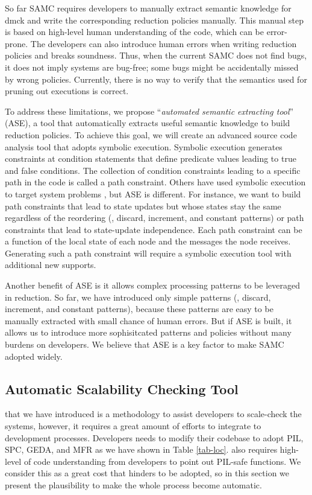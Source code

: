 So far SAMC requires developers to manually extract semantic knowledge for dmck
and write the corresponding reduction policies manually. This manual step is
based on high-level human understanding of the code, which can be error-prone.
The developers can also introduce human errors when writing reduction policies
and breaks soundness. Thus, when the current SAMC does not find bugs, it does
not imply systems are bug-free; some bugs might be accidentally missed by wrong
policies. Currently, there is no way to verify that the semantics used for
pruning out executions is correct.

To address these limitations, we propose ``\textit{automated semantic extracting
tool}'' (ASE), a tool that automatically extracts useful semantic knowledge to
build reduction policies. To achieve this goal, we will create an advanced
source code analysis tool that adopts symbolic execution. Symbolic execution
generates constraints at condition statements that define predicate values
leading to true and false conditions. The collection of condition constraints
leading to a specific path in the code is called a path constraint. Others have
used symbolic execution to target system problems
\cite{Bucur+14-SymbolicExecution}, but ASE is different. For instance, we want
to build path constraints that lead to state updates but whose states stay the
same regardless of the reordering (\eg, discard, increment, and constant
patterns) or path constraints that lead to state-update independence. Each path
constraint can be a function of the local state of each node and the messages
the node receives. Generating such a path constraint will require a symbolic
execution tool with additional new supports.

Another benefit of ASE is it allows complex processing patterns to be leveraged
in reduction. So far, we have introduced only simple patterns (\eg, discard,
increment, and constant patterns), because these patterns are easy to be
manually extracted with small chance of human errors. But if ASE is built, it
allows us to introduce more sophisitcated patterns and policies without many
burdens on developers. We believe that ASE is a key factor to make SAMC adopted
widely.

\subsection{Automatic Scalability Checking Tool}

\sck that we have introduced is a methodology to assist developers to
scale-check the systems, however, it requires a great amount of efforts to
integrate to development processes.  Developers needs to modify their codebase
to adopt PIL, SPC, GEDA, and MFR as we have shown in Table \ref{tab-loc}. \sck
also requires high-level of code understanding from developers to point out
PIL-safe functions. We consider this as a great cost that hinders \sck to be
adopted, so in this section we present the plausibility to make the whole
process become automatic.

